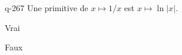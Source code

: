 \begin{truefalse}{q-267}
Une primitive de $x\mapsto 1/x$ est $x\mapsto \ln|x|$.
\item* Vrai
\item Faux
\end{truefalse}

